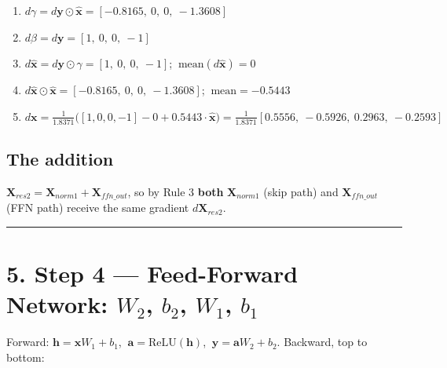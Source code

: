 \documentclass[11pt,a4paper,oneside]{report}
\providecommand{\tightlist}{\setlength{\itemsep}{0pt}\setlength{\parskip}{0pt}}
\begin{document}
\begin{enumerate}
\def\labelenumi{\arabic{enumi}.}
\tightlist
\item
  \(d\gamma = d\mathbf{y} \odot \hat{\mathbf{x}} = [-0.8165,\ 0,\ 0,\ -1.3608]\)
\item
  \(d\beta = d\mathbf{y} = [1,\ 0,\ 0,\ -1]\)
\item
  \(d\hat{\mathbf{x}} = d\mathbf{y} \odot \gamma = [1,\ 0,\ 0,\ -1]\); \(\ \text{mean}(d\hat{\mathbf{x}}) = 0\)
\item
  \(d\hat{\mathbf{x}} \odot \hat{\mathbf{x}} = [-0.8165,\ 0,\ 0,\ -1.3608]\); \(\ \text{mean} = -0.5443\)
\item
  \(d\mathbf{x} = \frac{1}{1.8371}\big([1, 0, 0, -1] - 0 + 0.5443 \cdot \hat{\mathbf{x}}\big) = \frac{1}{1.8371}[0.5556,\ -0.5926,\ 0.2963,\ -0.2593]\)
\end{enumerate}

\begin{center}\end{center}

\subsection{The addition}\label{the-addition}

\(\mathbf{X}_{res2} = \mathbf{X}_{norm1} + \mathbf{X}_{ffn\_out}\), so by Rule 3 \textbf{both} \(\mathbf{X}_{norm1}\) (skip path) and \(\mathbf{X}_{ffn\_out}\) (FFN path) receive the same gradient \(d\mathbf{X}_{res2}\).

\begin{center}\rule{0.5\linewidth}{0.5pt}\end{center}

\section{\texorpdfstring{5. Step 4 --- Feed-Forward Network: \(W_2\), \(b_2\), \(W_1\), \(b_1\)}{5. Step 4 --- Feed-Forward Network: W\_2, b\_2, W\_1, b\_1}}\label{5-step-4--feed-forward-network-w_2-b_2-w_1-b_1}

Forward: \(\mathbf{h} = \mathbf{x} W_1 + b_1\), \(\ \mathbf{a} = \text{ReLU}(\mathbf{h})\), \(\ \mathbf{y} = \mathbf{a} W_2 + b_2\). Backward, top to bottom:
\end{document}
